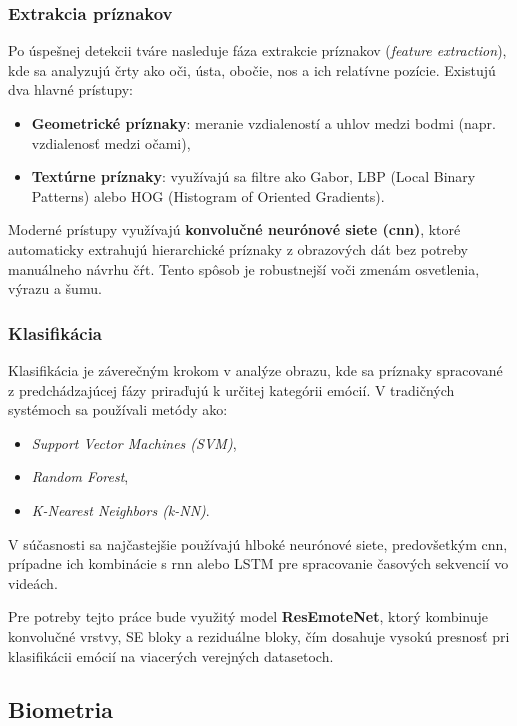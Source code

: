 \subsubsection{Extrakcia príznakov}
Po úspešnej detekcii tváre nasleduje fáza extrakcie príznakov (\emph{feature extraction}), kde sa analyzujú črty ako oči, ústa, obočie, nos a ich relatívne pozície. Existujú dva hlavné prístupy:

\begin{itemize}
    \item \textbf{Geometrické príznaky}: meranie vzdialeností a uhlov medzi bodmi (napr. vzdialenosť medzi očami),
    \item \textbf{Textúrne príznaky}: využívajú sa filtre ako Gabor, LBP (Local Binary Patterns) alebo HOG (Histogram of Oriented Gradients).
\end{itemize}

Moderné prístupy využívajú \textbf{konvolučné neurónové siete (\gls{cnn})}, ktoré automaticky extrahujú hierarchické príznaky z obrazových dát bez potreby manuálneho návrhu čŕt. Tento spôsob je robustnejší voči zmenám osvetlenia, výrazu a šumu.

\subsubsection{Klasifikácia}
Klasifikácia je záverečným krokom v analýze obrazu, kde sa príznaky spracované z predchádzajúcej fázy priraďujú k určitej kategórii emócií. V tradičných systémoch sa používali metódy ako:
\begin{itemize}
    \item \emph{Support Vector Machines (SVM)},
    \item \emph{Random Forest},
    \item \emph{K-Nearest Neighbors (k-NN)}.
\end{itemize}

V súčasnosti sa najčastejšie používajú hlboké neurónové siete, predovšetkým \gls{cnn}, prípadne ich kombinácie s \gls{rnn} alebo LSTM pre spracovanie časových sekvencií vo videách.

Pre potreby tejto práce bude využitý model \textbf{ResEmoteNet}, ktorý kombinuje konvolučné vrstvy, SE bloky a reziduálne bloky, čím dosahuje vysokú presnosť pri klasifikácii emócií na viacerých verejných datasetoch.

\subsection{Biometria}

